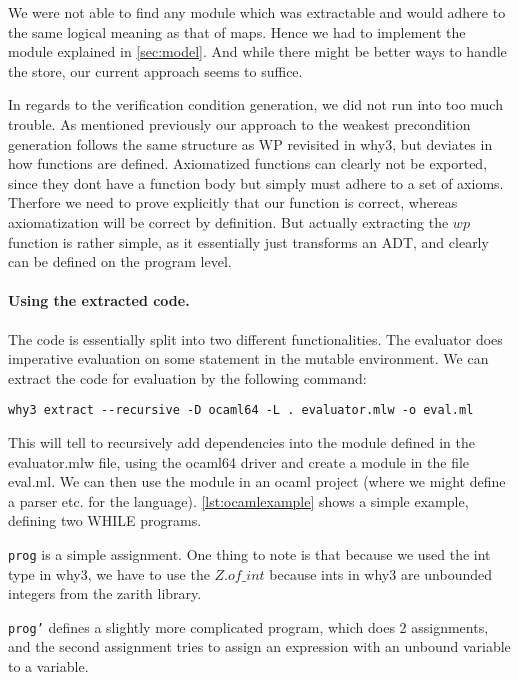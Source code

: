 We were not able to find any module which was extractable and would adhere to the same logical meaning as that of maps.
Hence we had to implement the module explained in \ref{sec:model}.
And while there might be better ways to handle the store, our current approach seems to suffice.

In regards to the verification condition generation, we did not run into too much trouble.
As mentioned previously our approach to the weakest precondition generation follows the same
structure as WP revisited in why3\cite{wp-revisited},
but deviates in how functions are defined.
Axiomatized functions can clearly not be exported,
since they dont have a function body but simply must adhere to a set of axioms.
Therfore we need to prove explicitly that our function is correct,
whereas axiomatization will be correct by definition.
But actually extracting the $wp$ function is rather simple, as it essentially just transforms an ADT,
and clearly can be defined on the program level.


\paragraph{Using the extracted code.}
The code is essentially split into two different functionalities.
The evaluator does imperative evaluation on some statement in the mutable environment.
We can extract the code for evaluation by the following command:

\begin{lstlisting}
why3 extract --recursive -D ocaml64 -L . evaluator.mlw -o eval.ml
\end{lstlisting}

This will tell to recursively add dependencies into the module defined in the evaluator.mlw file, using the ocaml64 driver and create a module in the file eval.ml.
We can then use the module in an ocaml project (where we might define a parser etc. for the language).
\autoref{lst:ocamlexample} shows a simple example, defining two WHILE programs.

\texttt{prog} is a simple assignment. One thing to note is that because we used the int type in
why3, we have to use the \(Z.of\_int\) because ints in why3 are unbounded integers from the zarith library.

\texttt{prog'} defines a slightly more complicated program, which does 2 assignments, and the second assignment tries to assign an expression with an unbound variable to a variable.

